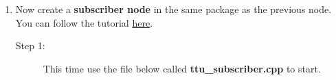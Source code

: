 \documentclass[12pt]{article}
\newcommand{\R}{\color{red}}
\newcommand{\K}{\color{black}}
\newcommand{\G}{\color{mygreen}}
\newcommand{\PR}{\color{mypurple}}
\newcommand{\pkgname}{\G<package\_name>\K}
\newcommand{\wspname}{\R<workspace\_name>\K}
\newcommand{\nodname}{\PR<node\_name>\K}
\newcommand{\tpcname}{/topic\_name}
\newcommand{\home}{\textasciitilde/}
\begin{document}
\begin{enumerate}
\begin{description}
This will build your system and check for errors in your entire workspace.\\\\
{\bf \texttt{\$ cd \home\wspname}} \\
{\bf \texttt{\$ catkin\textunderscore make}} \\\\
Start a core\\\\
{\bf \texttt{\$ roscore}}\\\\
Start your new node\\\\
{\bf \texttt{\$ rosrun \pkgname\hspace{3mm}\nodname}}\\\\
{\bf \texttt{\$ rostopic list}}\\\\
You should now be able to see your topic. Now lets do something more fun. Turn on a turtle.\\\\

{\bf \texttt{\$ rosrun turtlesim turtlesim\textunderscore node}}\\\\
Now start your publisher node with the cmd\textunderscore vel topic patched through to the turtle like we did previously.\\\\
{\bf \texttt{\$ rosrun \pkgname\hspace{3mm}\nodname \hspace{3mm}\tpcname:=/turtle1/cmd\textunderscore vel}}\\\\
 \end{description}
 
\newpage

\item Now create a {\bf subscriber node} in the same package as the previous node. You can follow the tutorial \href{http://wiki.ros.org/ROS/Tutorials/WritingPublisherSubscriber(c++)} {here}. 

\begin{description}
\item [Step 1:] This time use the file below called {\bf ttu\_subscriber.cpp} to start.\\

  \begin{lstlisting}


\end{lstlisting}
\end{description}
\end{enumerate}
\end{document}
